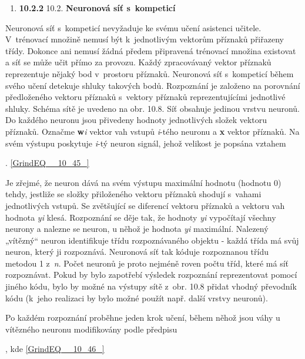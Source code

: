\noindent \begin{enumerate}
\item \textbf{10.2.2  }10.2. \textbf{Neuronová síť s~kompeticí}
\end{enumerate}

\noindent Neuronová síť s~kompeticí nevyžaduje ke svému učení asistenci učitele. V~trénovací množině nemusí být k~jednotlivým vektorům příznaků přiřazeny třídy. Dokonce ani nemusí žádná předem připravená trénovací množina existovat a síť se může učit přímo za provozu. Každý zpracovávaný vektor příznaků reprezentuje nějaký bod v~prostoru příznaků. Neuronová síť s~kompeticí během svého učení detekuje shluky takových bodů. Rozpoznání je založeno na porovnání předloženého vektoru příznaků s~vektory příznaků reprezentujícími jednotlivé shluky. Schéma sítě je uvedeno na obr. 10.8. Síť obsahuje jedinou vrstvu neuronů. Do každého neuronu jsou přivedeny hodnoty jednotlivých složek vektoru příznaků. Označme \textbf{w}\textit{i} vektor vah vstupů \textit{i}-tého neuronu a \textbf{x} vektor příznaků. Na svém výstupu poskytuje \textit{i}-tý neuron signál, jehož velikost je popsána vztahem 

 . \eqref{GrindEQ__10_45_}

\noindent 

\noindent Je zřejmé, že neuron dává na svém výstupu maximální hodnotu (hodnotu 0) tehdy, jestliže se složky přiloženého vektoru příznaků shodují s~vahami jednotlivých vstupů. Se zvětšující se diferencí vektoru příznaků a vektoru vah hodnota \textit{yi} klesá. Rozpoznání se děje tak, že hodnoty \textit{yi} vypočítají všechny neurony a nalezne se neuron, u něhož je hodnota \textit{yi} maximální. Nalezený „vítězný`` neuron identifikuje třídu rozpoznávaného objektu - každá třída má svůj neuron, který ji rozpoznává. Neuronová síť tak kóduje rozpoznanou třídu metodou 1 z~\textit{n}. Počet neuronů je proto nejméně roven počtu tříd, které má síť rozpoznávat. Pokud by bylo zapotřebí výsledek rozpoznání reprezentovat pomocí jiného kódu, bylo by možné na výstupy sítě z~obr. 10.8 přidat vhodný převodník kódu (k~jeho realizaci by bylo možné použít např. další vrstvy neuronů). 

\noindent 

\noindent Po každém rozpoznání proběhne jeden krok učení, během něhož jsou váhy u vítězného neuronu modifikovány podle předpisu

 ,   kde    \eqref{GrindEQ__10_46_}

